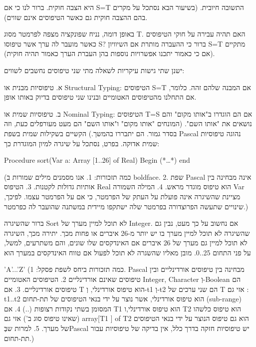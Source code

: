 \begin{טבלא}[!htbp]
\begin{verbatim}
\end{verbatim}

      היא הצבה חוקית. ברור לנו כי אם S=T התשובה חיובית. (בשיעור הבא נסתכל על מקרים בהם ההצבה חוקית גם כאשר הטיפוסים אינם שווים).

      באופן דומה, נניח שפונקציה מצפה לפרמטר מסוג T. האם תהיה עבירה על חוקי הטיפוסים כאשר מועבר לה ערך אשר טיפוסו S? ברור כי ההעברה מותרת אם השיוויון S=T מתקיים (אם כי כאמור יתכנו אפשרויות נוספות בהן העברת הערך כאמור תהיה חוקית).

      ישנן שתי גישות עיקריות לשאלה מתי שני טיפוסים נחשבים לשווים:

      א. טיפוסיות מבנית או Structural Typing: הטיפוסים S=T אם המבנה שלהם זהה. כלומר, אם התחלנו מהטיפוסים האטומיים ובנינו שני טיפוסים בדיוק באותו אופן.

      ב. טיפוסיות שמית או Nominal Typing: הטיפוסים T=S אם הם הוגדרו ב"אותו מקום" והם נושאים את "אותו השם". (המונחים "אותו מקום" ו"אותו השם" הם מעט מעורפלים כעת, וזה בסדר גמור. הם יתבררו בהמשך.)
      הקשיים בשקילות שמית
      בשפת Pascal נהוגה טיפוסיות שמית אדוקה. בפרט, נסתכל על שיגרה למיון המוגדרת כך:

      Procedure sort(Var a: Array [1..26] of Real)
      Begin
      (*…*)
      end

      (כמה תזכורות:
      1. אנו מסמנים מילים שמורות ב boldface.
      2. שפת Pascal אינה מבחינה בין אותיות גדולות לקטנות.
      3. הטיפוס Real הוא טיפוס מוגדר מראש.
      4. המילה השמורה Var מציינת שהשיגרה אינה פועלת על העתק של הפרמטר, כי אם על הפרמטר עצמו. לפיכך, שינויים שתעשה הפרוצדורה בפרמטר שלה ישתקפו מיידית במשתנה שהועבר לה כפרמטר.)

      ברור שהשיגרה Sort לא תוכל למיין מערך של Integer. אם נחשוב על כך מעט, נבין גם שהשיגרה לא תוכל למיין מערך בו יש יותר מ-26 איברים או פחות מכך. יתירה מכך, השיגרה לא תוכל למיין גם מערך של 26 איברים אם האינדקסים שלו שונים, והם משתרעים, למשל, על פני התחום 25..0. מובן מאליו שהשגרה לא תוכל לפעול אם טווח האינדקסים במערך הוא

      ’A’...’Z’
      (כמה תזכורות ביחס לשפת פסקל:
      1. Pascal מבחינה בין טיפוסים אורדינליים ובין טיפוסים שאינם אורדינליים
      2. הטיפוסים האטומיים Integer, Character וְ-Boolean הם טיפוסים אורדינליים.
      3. אם T הוא טיפוס אורדינלי, וְ-t1 וְ-t2 הם שני ערכים של T אזי גם : t1..t2 הוא טיפוס אורדינלי, אשר נוצר על ידי בנאי הטיפוסים של תת-תחום (sub-range) המסומן בשתי נקודות רצופות (..)
      4. אם T1 הוא טיפוס אורדינלי,ו T2 הוא טיפוס כלשהו (שאינו טיפוס סוג ב') אזי גם array[T1 ] of T2 הוא גם טיפוס הנוצר על ידי בנאי הטיפוסים של מערך.
      5. למרות שבְּPascal יש טיפוסיות חזקה בדרך כלל, אין בדיקה של טיפוסיות עבור תת-תחום.)


\end{טבלא}
